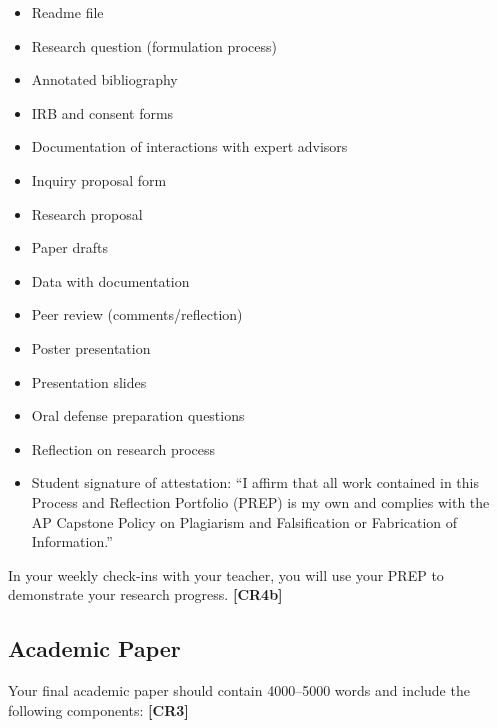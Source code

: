 \documentclass[11pt,]{article}
\providecommand{\tightlist}{%
  \setlength{\itemsep}{0pt}\setlength{\parskip}{0pt}}
\begin{document}
\begin{itemize}
\tightlist
\item
  Readme file
\item
  Research question (formulation process)
\item
  Annotated bibliography
\item
  IRB and consent forms
\item
  Documentation of interactions with expert advisors
\item
  Inquiry proposal form
\item
  Research proposal
\item
  Paper drafts
\item
  Data with documentation
\item
  Peer review (comments/reflection)
\item
  Poster presentation
\item
  Presentation slides
\item
  Oral defense preparation questions
\item
  Reflection on research process
\item
  Student signature of attestation: ``I affirm that all work contained in this Process and Reflection Portfolio (PREP) is my own and complies with the AP Capstone Policy on Plagiarism and Falsification or Fabrication of Information.''
\end{itemize}

In your weekly check-ins with your teacher, you will use your PREP to demonstrate your research progress. \textbf{{[}CR4b{]}} 

\hypertarget{academic-paper}{%
\subsection{Academic Paper}\label{academic-paper}}

Your final academic paper should contain 4000--5000 words and include the following components: \textbf{{[}CR3{]}} 
\end{document}
